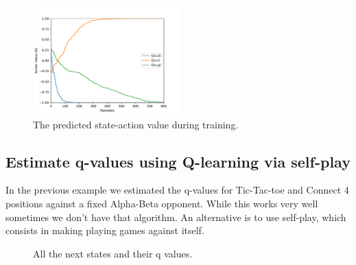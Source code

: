 \documentclass{article}
\begin{document}

\begin{figure}[!h]
    \centering
    \includegraphics[width=0.50\textwidth]{figures/c4_ql_tab_action_values.pdf}
    \caption{The predicted state-action value during training.}
    \label{fig:c4-ql-tab-qvalues-progress}
\end{figure}

\subsection{Estimate q-values using Q-learning via self-play}

In the previous example we estimated the q-values for Tic-Tac-toe and Connect 4 positions against a
fixed Alpha-Beta opponent. While this works very well sometimes we don't have that algorithm. An
alternative is to use self-play, which consists in making playing games against itself.



\begin{figure}[!h]
    \centering
     \hspace{0.1in}
    \caption{All the next states and their q values.}
    \label{fig:ql-tab-simple-selfplay-progress}
\end{figure}
\end{document}

